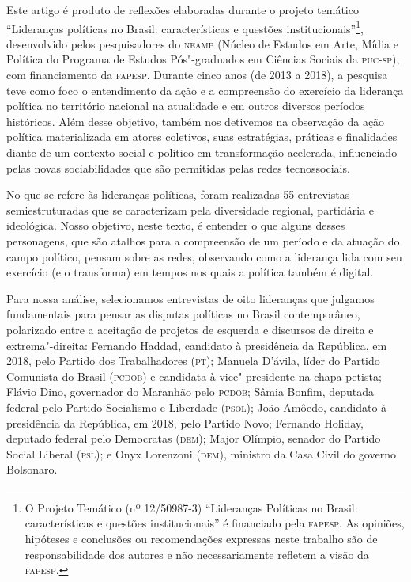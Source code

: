 Este artigo é produto de reflexões elaboradas durante o projeto temático
``Lideranças políticas no Brasil: características e questões
institucionais''\footnote{O Projeto Temático (nº 12/50987-3)
  ``Lideranças Políticas no Brasil: características e questões
  institucionais'' é financiado pela \textsc{fapesp}. As opiniões, hipóteses e
  conclusões ou recomendações expressas neste trabalho são de
  responsabilidade dos autores e não necessariamente refletem a visão da
  \textsc{fapesp}.}, desenvolvido pelos pesquisadores do \textsc{neamp} (Núcleo de Estudos
em Arte, Mídia e Política do Programa de Estudos Pós"-graduados em
Ciências Sociais da \textsc{puc}-\textsc{sp}), com financiamento da \textsc{fapesp}. Durante cinco
anos (de 2013 a 2018), a pesquisa teve como foco o entendimento da ação
e a compreensão do exercício da liderança política no território
nacional na atualidade e em outros diversos períodos históricos. Além
desse objetivo, também nos detivemos na observação da ação política
materializada em atores coletivos, suas estratégias, práticas e
finalidades diante de um contexto social e político em transformação
acelerada, influenciado pelas novas sociabilidades que são permitidas
pelas redes tecnossociais.

No que se refere às lideranças políticas, foram realizadas 55
entrevistas semiestruturadas que se caracterizam pela diversidade
regional, partidária e ideológica. Nosso objetivo, neste texto, é
entender o que alguns desses personagens, que são atalhos para a
compreensão de um período e da atuação do campo político, pensam sobre
as redes, observando como a liderança lida com seu exercício (e o
transforma) em tempos nos quais a política também é digital.

Para nossa análise, selecionamos entrevistas de oito lideranças que
julgamos fundamentais para pensar as disputas políticas no Brasil
contemporâneo, polarizado entre a aceitação de projetos de esquerda e
discursos de direita e extrema"-direita: Fernando Haddad, candidato à
presidência da República, em 2018, pelo Partido dos Trabalhadores (\textsc{pt});
Manuela D'ávila, líder do Partido Comunista do Brasil (\textsc{pcdob}) e
candidata à vice"-presidente na chapa petista; Flávio Dino, governador do
Maranhão pelo \textsc{pcdob}; Sâmia Bonfim, deputada federal pelo Partido
Socialismo e Liberdade (\textsc{psol}); João Amôedo, candidato à presidência da
República, em 2018, pelo Partido Novo; Fernando Holiday, deputado
federal pelo Democratas (\textsc{dem}); Major Olímpio, senador do Partido Social
Liberal (\textsc{psl}); e Onyx Lorenzoni (\textsc{dem}), ministro da Casa Civil do governo
Bolsonaro.

